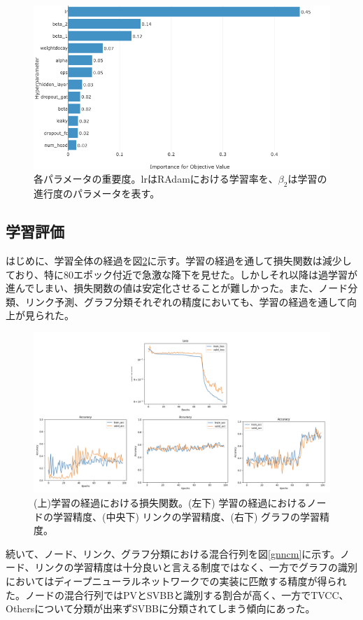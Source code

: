 \begin{figure}[H]
	\begin{center}
 \includegraphics[keepaspectratio, scale=0.3]
 	{Figure/Flavortagging/bayesian3.png}
 		\caption{各パラメータの重要度。lrはRAdamにおける学習率を、$\beta_2$は学習の進行度のパラメータを表す。}
 		\label{bayes3}
	\end{center}
\end{figure}

\subsection{学習評価}
はじめに、学習全体の経過を図\ref{gnnoutput}に示す。学習の経過を通して損失関数は減少しており、特に80エポック付近で急激な降下を見せた。しかしそれ以降は過学習が進んでしまい、損失関数の値は安定化させることが難しかった。また、ノード分類、リンク予測、グラフ分類それぞれの精度においても、学習の経過を通して向上が見られた。

\begin{figure}[H]
	\begin{center}
 \includegraphics[keepaspectratio, scale=0.3]
 	{Figure/Flavortagging/gnnoutput.png}
 		\caption{(上)学習の経過における損失関数。(左下) 学習の経過におけるノードの学習精度、(中央下) リンクの学習精度、(右下) グラフの学習精度。}
 		\label{gnnoutput}
	\end{center}
\end{figure}
続いて、ノード、リンク、グラフ分類における混合行列を図\ref{gnncm}に示す。ノード、リンクの学習精度は十分良いと言える制度ではなく、一方でグラフの識別においてはディープニューラルネットワークでの実装に匹敵する精度が得られた。ノードの混合行列ではPVとSVBBと識別する割合が高く、一方でTVCC、Othersについて分類が出来ずSVBBに分類されてしまう傾向にあった。

